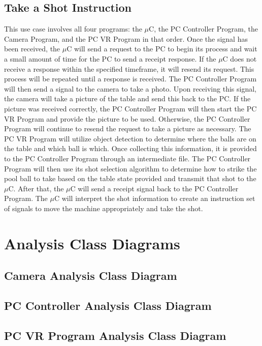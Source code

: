 \documentclass[titlepage]{article}
\begin{document}
\subsection{Take a Shot Instruction}
This use case involves all four programs: the $\mu$C, the PC Controller Program, the Camera Program, and the PC VR Program in that order. Once the signal has been received, the $\mu$C will send a request to the PC to begin its process and wait a small amount of time for the PC to send a receipt response. If the $\mu$C does not receive a response within the specified timeframe, it will resend its request. This process will be repeated until a response is received. The PC Controller Program will then send a signal to the camera to take a photo. Upon receiving this signal, the camera will take a picture of the table and send this back to the PC. If the picture was received correctly, the PC Controller Program will then start the PC VR Program and provide the picture to be used. Otherwise, the PC Controller Program will continue to resend the request to take a picture as necessary. The PC VR Program will utilize object detection to determine where the balls are on the table and which ball is which. Once collecting this information, it is provided to the PC Controller Program through an intermediate file. The PC Controller Program will then use its shot selection algorithm to determine how to strike the pool ball to take based on the table state provided and transmit that shot to the $\mu$C. After that, the $\mu$C will send a receipt signal back to the PC Controller Program. The $\mu$C will interpret the shot information to create an instruction set of signals to move the machine appropriately and take the shot.


\section{Analysis Class Diagrams}
\subsection{Camera Analysis Class Diagram}
\subsection{PC Controller Analysis Class Diagram}
\subsection{PC VR Program Analysis Class Diagram}
\end{document}
